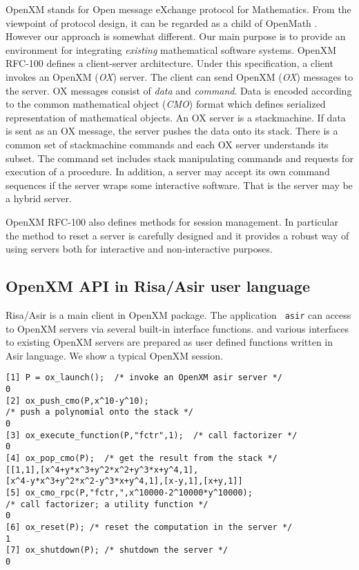 \documentclass[runningheads]{cl2emult}
\begin{document}
OpenXM stands for Open message eXchange protocol for Mathematics.
From the viewpoint of protocol design, it can be regarded as a child
of OpenMath \cite{OPENMATH}.  However our approach is somewhat
different. Our main purpose is to provide an environment for
integrating {\it existing} mathematical software systems. OpenXM
RFC-100 \cite{RFC100} defines a client-server architecture.  Under
this specification, a client invokes an OpenXM ({\it OX}) server.  The
client can send OpenXM ({\it OX}) messages to the server.  OX messages
consist of {\it data} and {\it command}. Data is encoded according to
the common mathematical object ({\it CMO}) format which defines
serialized representation of mathematical objects.  An OX server is a
stackmachine. If data is sent as an OX message, the server pushes the
data onto its stack. There is a common set of stackmachine commands
and each OX server understands its subset. The command set includes
stack manipulating commands and requests for execution of a procedure. 
In addition, a server may accept its own command sequences if the
server wraps some interactive software. That is the server may be a
hybrid server.

OpenXM RFC-100 also defines methods for session management. In particular
the method to reset a server is carefully designed and it provides
a robust way of using servers both for interactive and non-interactive
purposes.

\subsection{OpenXM API in Risa/Asir user language}

Risa/Asir is a main client in OpenXM package.  The application {\tt
asir} can access to OpenXM servers via several built-in interface
functions. and various interfaces to existing OpenXM servers are
prepared as user defined functions written in Asir language. 
We show a typical OpenXM session.

\begin{verbatim}
[1] P = ox_launch();  /* invoke an OpenXM asir server */
0
[2] ox_push_cmo(P,x^10-y^10);
/* push a polynomial onto the stack */
0
[3] ox_execute_function(P,"fctr",1);  /* call factorizer */
0
[4] ox_pop_cmo(P);  /* get the result from the stack */
[[1,1],[x^4+y*x^3+y^2*x^2+y^3*x+y^4,1],
[x^4-y*x^3+y^2*x^2-y^3*x+y^4,1],[x-y,1],[x+y,1]]
[5] ox_cmo_rpc(P,"fctr,",x^10000-2^10000*y^10000); 
/* call factorizer; a utility function */
0
[6] ox_reset(P); /* reset the computation in the server */
1
[7] ox_shutdown(P); /* shutdown the server */
0
\end{verbatim}
\end{document}

